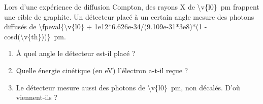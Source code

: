 Lors d'une expérience de diffusion Compton, des rayons X de \qty{\v{l0}}{pm} frappent une cible de graphite. Un détecteur placé à un certain angle mesure des photons diffusés de \qty[round-mode=places,round-precision=3]{\fpeval{\v{l0} + 1e12*6.626e-34/(9.109e-31*3e8)*(1 - cosd(\v{th}))}}{pm}.

\begin{enumerate}[label=\alph*)]
    \item À quel angle le détecteur est-il placé ?
    \item Quelle énergie cinétique (en eV) l'électron a-t-il reçue ?
    \item Le détecteur mesure aussi des photons de \qty{\v{l0}}{pm}, non décalés. D'où viennent-ils ?
\end{enumerate}
